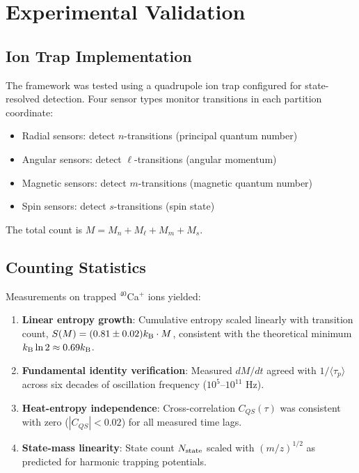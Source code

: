 \section{Experimental Validation}
\label{sec:experiment}

\subsection{Ion Trap Implementation}

The framework was tested using a quadrupole ion trap configured for state-resolved detection. Four sensor types monitor transitions in each partition coordinate:

\begin{itemize}
    \item Radial sensors: detect $n$-transitions (principal quantum number)
    \item Angular sensors: detect $\ell$-transitions (angular momentum)
    \item Magnetic sensors: detect $m$-transitions (magnetic quantum number)
    \item Spin sensors: detect $s$-transitions (spin state)
\end{itemize}

The total count is $M = M_n + M_\ell + M_m + M_s$.

\subsection{Counting Statistics}

Measurements on trapped $^{40}$Ca$^+$ ions yielded:

\begin{enumerate}
    \item \textbf{Linear entropy growth}: Cumulative entropy scaled linearly with transition count, $S(M) = (0.81 \pm 0.02) k_{\mathrm{B}} \cdot M$, consistent with the theoretical minimum $k_{\mathrm{B}} \ln 2 \approx 0.69 k_{\mathrm{B}}$.

    \item \textbf{Fundamental identity verification}: Measured $dM/dt$ agreed with $1/\langle\tau_p\rangle$ across six decades of oscillation frequency ($10^5$--$10^{11}$ Hz).

    \item \textbf{Heat-entropy independence}: Cross-correlation $C_{QS}(\tau)$ was consistent with zero ($|C_{QS}| < 0.02$) for all measured time lags.

    \item \textbf{State-mass linearity}: State count $N_{\mathrm{state}}$ scaled with $(m/z)^{1/2}$ as predicted for harmonic trapping potentials.
\end{enumerate}

